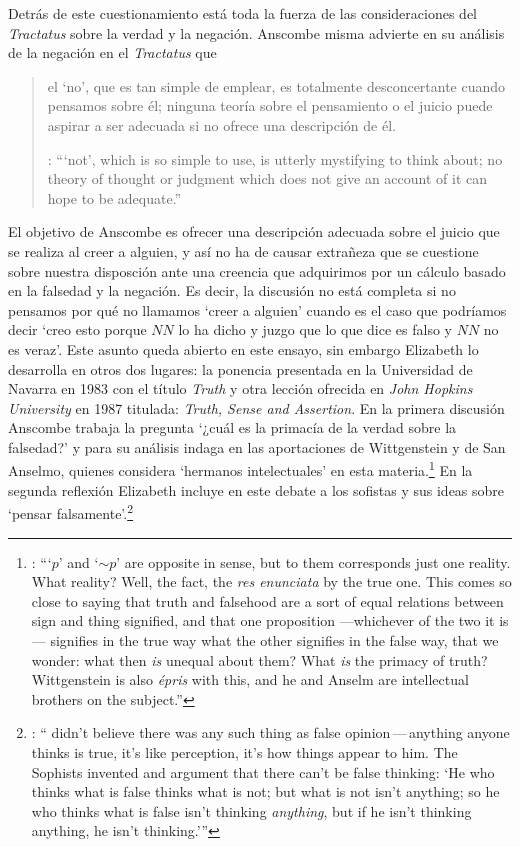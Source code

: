 Detrás de este cuestionamiento está toda la fuerza de las consideraciones del \emph{Tractatus} sobre la verdad y la negación. Anscombe misma advierte en su análisis de la negación en el \emph{Tractatus} que \blockquote[{\cite[19]{anscombe1959iwt}}: \enquote{`not', which is so simple to use, is utterly mystifying to think about; no theory of thought or judgment which does not give an account of it can hope to be adequate.}]{el `no', que es tan simple de emplear, es totalmente desconcertante cuando pensamos sobre él; ninguna teoría sobre el pensamiento o el juicio puede aspirar a ser adecuada si no ofrece una descripción de él.} El objetivo de Anscombe es ofrecer una descripción adecuada sobre el juicio que se realiza al creer a alguien, y así no ha de causar extrañeza que se cuestione sobre nuestra disposción ante una creencia que adquirimos por un cálculo basado en la falsedad y la negación. Es decir, la discusión no está completa si no pensamos por qué no llamamos `creer a alguien' cuando es el caso que podríamos decir \enquote*{creo esto porque $NN$ lo ha dicho y juzgo que lo que dice es falso y $NN$ no es veraz}. Este asunto queda abierto en este ensayo, sin embargo Elizabeth lo desarrolla en otros dos lugares: la ponencia presentada en la Universidad de Navarra en 1983 con el título \emph{Truth} y otra lección ofrecida en \emph{John Hopkins University} en 1987 titulada: \emph{Truth, Sense and Assertion}. En la primera discusión Anscombe trabaja la pregunta \enquote*{¿cuál es la primacía de la verdad sobre la falsedad?} y para su análisis indaga en las aportaciones de Wittgenstein y de San Anselmo, quienes considera `hermanos intelectuales' en esta materia.\footnote{\cite[Cf.~][73]{anscombe2011plato:truth}: \enquote{`$p$' and `${\sim}p$' are opposite in sense, but to them corresponds just one reality. What reality? Well, the fact, the \emph{res enunciata} by the true one. This comes so close to saying that truth and falsehood are a sort of equal relations between sign and thing signified, and that one proposition ---whichever of the two it is--- signifies in the true way what the other signifies in the false way, that we wonder: what then \emph{is} unequal about them? What \emph{is} the primacy of truth? Wittgenstein is also \emph{épris} with this, and he and Anselm are intellectual brothers on the subject.}} En la segunda reflexión Elizabeth incluye en este debate a los sofistas y sus ideas sobre `pensar falsamente'.\footnote{\cite[264]{anscombe2015logic:tsa}: \enquote{ didn't believe there was any such thing as false opinion\,---\,anything anyone thinks is true, it's like perception, it's how things appear to him. The Sophists invented and argument that there can't be false thinking: `He who thinks what is false thinks what is not; but what is not isn't anything; so he who thinks what is false isn't thinking \emph{anything}, but if he isn't thinking anything, he isn't thinking.'}}

